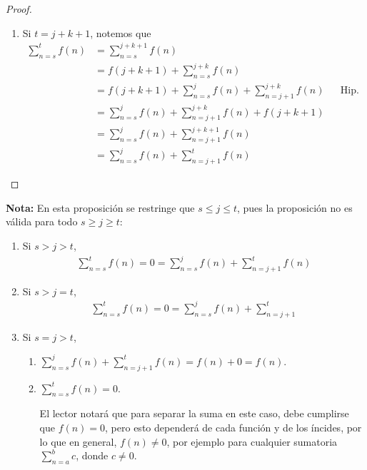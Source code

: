 \begin{enumerate}[label=\alph*)]
\begin{proof}
\begin{enumerate}[label=\Roman*)]
\begin{enumerate}[label=\roman*)]
          \item Si $t=j+k+1$, notemos que
          \begin{align*}
            \sum_{n=s}^{t}f(n) &= \sum_{n=s}^{j+k+1}f(n)\\
            &= f(j+k+1) + \sum_{n=s}^{j+k}f(n)\\
            &= f(j+k+1) + \sum_{n=s}^{j}f(n) + \sum_{n=j+1}^{j+k}f(n) && \text{Hip. Ind.}\\
            &= \sum_{n=s}^{j}f(n) + \sum_{n=j+1}^{j+k}f(n) +f(j+k+1)\\
            &= \sum_{n=s}^{j}f(n) + \sum_{n=j+1}^{j+k+1}f(n)\\
            &= \sum_{n=s}^{j}f(n) + \sum_{n=j+1}^{t}f(n)
          \end{align*}
        \end{enumerate}
    \end{enumerate}
  \end{proof}

  \textbf{Nota:} En esta proposición se restringe que $s\leq j\leq t$, pues la proposición no es válida para todo $s\geq j\geq t$:
  \begin{enumerate}[label=\Roman*)]
  \item Si $s>j>t$,
  \begin{align*}
    \sum_{n=s}^{t} f(n) = 0 = \sum_{n=s}^{j} f(n) + \sum_{n=j+1}^{t} f(n)
  \end{align*}

  \item Si $s>j=t$,
  \begin{align*}
    \sum_{n=s}^{t} f(n)= 0 = \sum_{n=s}^{j} f(n) + \sum_{n=j+1}^{t}
  \end{align*}

  \item Si $s=j>t$,
  \begin{enumerate}[label=\roman*)]
    \item $\sum_{n=s}^{j} f(n) + \sum_{n=j+1}^{t} f(n) = f(n) + 0 = f(n)$.
    \item $\sum_{n=s}^{t} f(n) = 0$.
    
    El lector notará que para separar la suma en este caso, debe cumplirse que $f(n)=0$, pero esto dependerá de cada función y de los íncides, por lo que en general, $f(n)\neq 0$, por ejemplo para cualquier sumatoria $\sum_{n=a}^{b} c$, donde $c\neq 0$.

  \end{enumerate}


\end{enumerate}
\end{enumerate}
